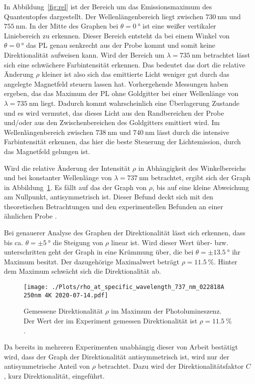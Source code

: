 In Abbildung~\ref{fig:rel} ist der Bereich um das Emissionsmaximum des Quantentopfes dargestellt.
Der Wellenlängenbereich liegt zwischen $\SI{730}{\nano\meter}$ und $\SI{755}{\nano\meter}$.
In der Mitte des Graphen bei $\theta = \SI{0}{\degree}$ ist eine weißer vertikaler Liniebereich zu erkennen.
Dieser Bereich entsteht da bei einem Winkel von $\theta = \SI{0}{\degree}$ das PL genau senkrecht aus der Probe kommt
und somit keine Direktionalität aufweisen kann.
Wird der Bereich um  $\lambda = \SI{735}{\nano\meter}$ betrachtet 
lässt sich eine schwächere Farbintensität erkennen.
Das bedeutet das dort die relative Änderung $\rho$  kleiner ist also sich das emittierte Licht 
weniger gut durch das angelegte Magnetfeld steuern lassen hat.
Vorhergehende Messungen haben ergeben, das das Maximum der PL ohne Goldgitter bei 
einer Wellenlänge von $\lambda = \SI{735}{\nano\meter}$ liegt.
Dadurch kommt wahrscheinlich eine Überlagerung Zustande und 
es wird vermutet, das dieses Licht aus den Randbereichen der Probe und/oder aus den Zwischenbereichen des Goldgitters 
emittiert wird.
Im Wellenlängenbereich zwischen $\SI{738}{\nano\meter}$ und $\SI{740}{\nano\meter}$ lässt durch die intensive
Farbintensität erkennen, das hier die beste Steuerung der Lichtemission, durch das Magnetfeld gelungen ist.

Wird die relative Änderung der Intensität $\rho$ in Abhängigkeit des Winkelbereichs und bei 
konstanter Wellenlänge von $\lambda = \SI{737}{\nano\meter}$
betrachtet, ergibt sich der Graph in Abbildung~\ref{fig:dir}.
Es fällt auf das 
der Graph von $\rho$, bis auf eine kleine Abweichung am Nullpunkt,
antisymmetrisch ist.
Dieser Befund deckt sich mit den theoretischen Betrachtungen 
und den experimentellen Befunden an einer ähnlichen Probe \cite{felix}.

Bei genauerer Analyse des Graphen der Direktionalität lässt sich erkennen, dass bis ca. $\theta = \pm \SI{5}{\degree}$
die Steigung von $\rho$ linear ist.
Wird dieser Wert über- bzw. unterschritten geht der Graph in eine Krümmung über, die bei $\theta = \pm \SI{13,5}{\degree}$
ihr Maximum besitzt. 
Der dazugehörige Maximalwert beträgt $\rho = \SI{11,5}{\percent}$. 
Hinter dem Maximum schwächt sich die Direktionalität ab.
\begin{figure}
    \centering
    \texttt{[image: ./Plots/rho\_at\_specific\_wavelength\_737\_nm\_022818A 250nm 4K 2020-07-14.pdf]}
    \caption{Gemessene Direktionalität $\rho$ im Maximum der Photolumineszenz.
    Der Wert der im Experiment gemessen Direktionalität ist $\rho = \SI{11,5}{\percent}$.}
    \label{fig:dir}
\end{figure}
\FloatBarrier
Da bereits in mehreren Experimenten unabhängig dieser von Arbeit bestätigt wird, dass der Graph
der Direktionalität antisymmetrisch ist, wird nur der antisymmetrische Anteil von $\rho$ betrachtet.  
Dazu wird der Direktionalitätsfaktor $C$, kurz Direktionalität, eingeführt. 

